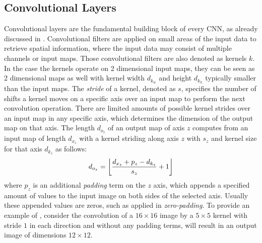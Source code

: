 
\subsection{Convolutional Layers}\label{sec:nn_theory_cnn}
Convolutional layers are the fundamental building block of every CNN, as already discussed in .
Convolutional filters are applied on small areas of the input data to retrieve spatial information, where the input data may consist of multiple channels or input maps.
Those convolutional filters are also denoted as kernels $k$.
In the case the kernels operate on 2 dimensional input maps, they can be seen as 2 dimensional maps as well with kernel width $d_{k_w}$ and height $d_{k_h}$ typically smaller than the input maps.
The \emph{stride} of a kernel, denoted as $s$, specifies the number of shifts a kernel moves on a specific axis over an input map to perform the next convolution operation.
There are limited amounts of possible kernel strides over an input map in any specific axis, which determines the dimension of the output map on that axis.
The length $d_{o_z}$ of an output map of axis $z$ computes from an input map of length $d_{x_z}$ with a kernel striding along axis $z$ with $s_z$ and kernel size for that axis $d_{k_z}$ as follows:
\begin{equation}\label{eq:nn_theory_cnn_dim}
  d_{o_z} = \floor*{\frac{d_{x_z} + p_z - d_{k_z}}{s_z} + 1}
\end{equation}
where $p_z$ is an additional \emph{padding} term on the $z$ axis, which appends a specified amount of values to the input image on both sides of the selected axis.
Usually these appended values are zeros, such as applied in \emph{zero-padding}.
To provide an example of , consider the convolution of a $16 \times 16$ image by a $5 \times 5$ kernel with stride $1$ in each direction and without any padding terms, will result in an output image of dimensions $12 \times 12$.

